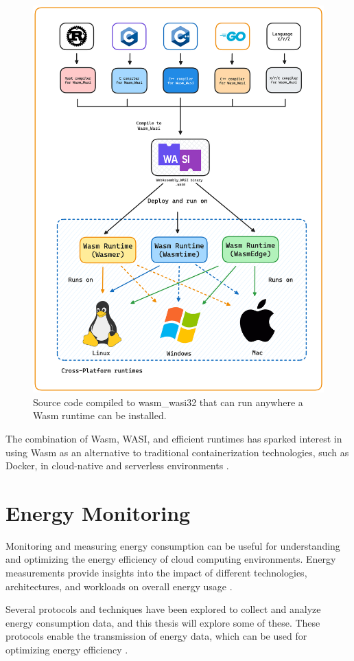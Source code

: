 \documentclass[
  table]{report}
\begin{document}
\begin{figure}[H]
\centering
  \includegraphics[width=0.7\columnwidth]{assets/3-wasm-runtime.png}
  \caption{Source code compiled to wasm\_wasi32 that can run anywhere
a \ac{Wasm} runtime can be installed.}
  \label{fig:wasm-runtimes}
\end{figure}

The combination of \ac{Wasm}, WASI, and efficient runtimes has sparked
interest in using \ac{Wasm} as an alternative to traditional
containerization technologies, such as Docker, in cloud-native and
serverless environments \citep{shillakerFaasmLightweightIsolation2020a,
sebrechtsAdaptingKubernetesControllers2022}.

\section{Energy Monitoring}
\label{sect:energy_monitoring}

Monitoring and measuring energy consumption can be useful for
understanding and optimizing the energy efficiency of cloud computing
environments. Energy measurements provide insights into the impact of
different technologies, architectures, and workloads on overall energy
usage
\citep{shehabiUnitedStatesData2016, al-fuqahaInternetThingsSurvey2015}.

Several protocols and techniques have been explored to collect and
analyze energy consumption data, and this thesis will explore some of
these. These protocols enable the transmission of energy data, which can
be used for optimizing energy efficiency
\citep{al-fuqahaInternetThingsSurvey2015}.
\end{document}
